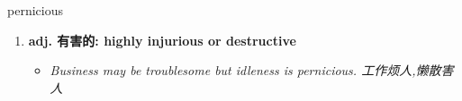 
\begin{frame}
{\huge pernicious}
\begin{center}
\begin{enumerate}\Large
  \item \textbf{adj. 有害的: highly injurious or destructive}
  \begin{itemize}
    \item \em{\Large{Business may be troublesome but idleness is pernicious. 工作烦人,懒散害人}}
  \end{itemize}
\end{enumerate}
\end{center}
\end{frame}

